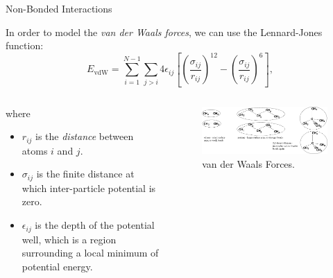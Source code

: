 \documentclass[aspectratio=169]{beamer}
\begin{document}
\begin{frame}[fragile]{Non-Bonded Interactions}

In order to model the \emph{van der Waals forces}, we can use the Lennard-Jones function:
%
\begin{equation}
	E_{\text{vdW}} = \sum_{i=1}^{N-1} \sum_{j > i} 4\epsilon_{ij} \left[\left(\frac{\sigma_{ij}}{r_{ij}}\right)^{12} - \left(\frac{\sigma_{ij}}{r_{ij}}\right)^6 \right],
\end{equation}
%
%
\begin{columns}
\begin{column}{0.5\textwidth}
	where
	\begin{itemize}
		\item $r_{ij}$ is the \emph{distance} between atoms $i$ and $j$.
		\item $\sigma_{ij}$ is the finite distance at which inter-particle potential is zero.
		\item $\epsilon_{ij}$ is the depth of the potential well, which is a region surrounding a local minimum of potential energy.
	\end{itemize}
\end{column}
%
\begin{column}{0.5\textwidth} 
	\begin{figure}
		\includegraphics[scale=0.3]{Graphics/vdW.png}
		\caption{van der Waals Forces.}
	\end{figure}
\end{column}
\end{columns}
%

\end{frame}
\end{document}
